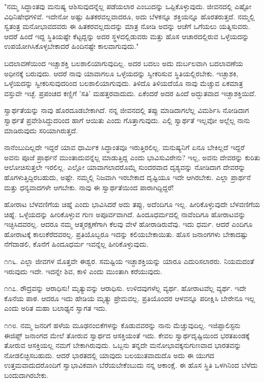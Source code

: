 "ನಮ್ಮ ಸಿದ್ಧಾಂತವು ಮನುಷ್ಯ ಆಶಿಸುವುದನ್ನೆಲ್ಲ ಪಡೆಯಲಾರ ಎಂಬುದನ್ನು ಒಪ್ಪಿಕೊಳ್ಳುವುದು. ಜೀವನದಲ್ಲಿ ಎಷ್ಟೋ ವಿಧಿನಿಷೇಧಗಳಿವೆ. ಇದೇನೋ ಅಷ್ಟು ಹಿತಕರವಲ್ಲವಾದರೂ, ಅದು ಬೆಳಕನ್ನೂ ಶಕ್ತಿಯನ್ನೂ ಹೊರತರುತ್ತದೆ. ನಮ್ಮಲ್ಲಿ ಸ್ವತಂತ್ರ ಮನೋಭಾವದವರು ಈ ಹಿತಕರವಲ್ಲದುದನ್ನು ಮಾತ್ರ ನೋಡಿ ಅದನ್ನು ಆಚೆಗೆ ಒಗೆಯಲು ಯತ್ನಿಸುವರು. ಆದರೆ ಹಿಂದೆ ಇದ್ದ ಸ್ಥಿತಿಯಷ್ಟೇ ಕೆಟ್ಟದ್ದನ್ನು ಅದರ ಸ್ಥಳದಲ್ಲಿಡುವರು ಮತ್ತು ಹೊಸ ಆಚಾರದಲ್ಲಿರುವ ಒಳ್ಳೆಯದನ್ನು ಉಪಯೋಗಿಸಿಕೊಳ್ಳಬೇಕಾದರೆ ಹಿಂದಿನಷ್ಟೇ ಕಾಲವಾಗುವುದು."

ಬದಲಾವಣೆಯಿಂದ ಇಚ್ಚಾಶಕ್ತಿ ಬಲಶಾಲಿಯಾಗುವುದಿಲ್ಲ. ಅದರ ಬದಲು ಅದು ದುರ್ಬಲವಾಗಿ ಬದಲಾವಣೆಯ ಅಧೀನಕ್ಕೆ ಬರುವುದು. ಆದರೆ ನಾವು ಯಾವಾಗಲೂ ಒಳ್ಳೆಯದನ್ನು ಸ್ವೀಕರಿಸುವ ಸ್ಥಿತಿಯಲ್ಲಿರಬೇಕು. ಇಚ್ಛಾಶಕಿ, ಒಳ್ಳೆಯದನ್ನು ಸ್ವೀಕರಿಸುವುದರಿಂದ ಬಲಶಾಲಿಯಾಗುವುದು. ತಿಳಿದೊ ತಿಳಿಯದೆಯೊ ನಾವು ಮೆಚ್ಚುವ ಏಕಮಾತ್ರ ವಸ್ತುವೇ ಇಚ್ಛೆ. ಪ್ರಪಂಚದ ಕಣ್ಣಿಗೆ 'ಸತಿ' ಮಹತ್ತರವಾದುದು. ಏಕೆಂದರೆ ಅದರ ಹಿಂದೆ ಅದ್ಭುತವಾದ ಇಚ್ಛಾಶಕ್ತಿಯಿದೆ.

ಸ್ವಾರ್ಥತೆಯನ್ನು ನಾವು ಹೊರದೂಡಬೇಕಾಗಿದೆ. ನನ್ನ ಜೀವನದಲ್ಲಿ ತಪ್ಪು ಮಾಡಿದಾಗಲೆಲ್ಲ ವಿಮರ್ಶಿಸಿ ನೋಡಿದಾಗ ಸ್ವಾರ್ಥತೆ ಪ್ರವೇಶಿಸಿದ್ದುದರಿಂದ ಹಾಗೆ ಆಯಿತು ಎಂದು ಗೊತ್ತಾಗುವುದು. ಎಲ್ಲಿ ಸ್ವಾರ್ಥತೆ ಇಲ್ಲವೋ ಅಲ್ಲೆಲ್ಲ ನಾನು ಮಾಡಿರುವುದು ಸರಿಯಾಗಿರುತ್ತದೆ.

ನಾನೆಂಬುದಿಲ್ಲದೇ ಇದ್ದರೆ ಯಾವ ಧಾರ್ಮಿಕ ಸಿದ್ಧಾಂತವೂ ಇರುತ್ತಿರಲಿಲ್ಲ. ಮನುಷ್ಯನಿಗೆ ಏನೂ ಬೇಕಿಲ್ಲದೆ ಇದ್ದರೆ ಅವನು ಪೂಜೆ ಪ್ರಾರ್ಥನೆ ಮುಂತಾದುವನ್ನೆಲ್ಲ ಮಾಡುತ್ತಿದ್ದ ಎಂದು ಭಾವಿಸುವಿರೇನು? ಇಲ್ಲ, ಅವನು ದೇವರನ್ನು ಕುರಿತು ಆಲೋಚಿಸುತ್ತಲೇ ಇರಲಿಲ್ಲ. ಎಲ್ಲೋ ಯಾವಾಗಲಾದರೊಮ್ಮೆ ಸುಂದರವಾದ ದೃಶ್ಯವನ್ನು ನೋಡಿದಾಗ ದೇವರನ್ನು ಹೊಗಳುತ್ತಿದ್ದಿರಬಹುದು, ಅಷ್ಟೇ. ನಮ್ಮಲ್ಲಿ ನಿಜವಾಗಿ ಇರಬೇಕಾದ ದೃಷ್ಟಿಯೂ ಇದೇ ಆಗಿರಬೇಕು. ಎಲ್ಲಾ ಪ್ರಾರ್ಥನೆ ಮತ್ತು ಧನ್ಯವಾದಗಳೇ ಆಗಬೇಕು. ನಾವು ಈ ಸ್ವಾರ್ಥತೆಯಿಂದ ಪಾರಾಗಿದ್ದಿದ್ದರೆ!

ಹೋರಾಟ ಬೆಳವಣಿಗೆಯ ಚಿಹ್ನೆ ಎಂದು ಭಾವಿಸಿದರೆ ಅದು ತಪ್ಪು, ಅದೆಂದಿಗೂ ಇಲ್ಲ. ಹೀರಿಕೊಳ್ಳುವುದೇ ಬೆಳವಣಿಗೆಯ ಚಿಹ್ನೆ. ಒಳ್ಳೆಯದನ್ನು ಹೀರಿಕೊಳ್ಳುವ ಗುಣ ಅಪೂರ್ವವಾಗಿದೆ. ಹಿಂದೂಧರ್ಮದಲ್ಲಿ ನಾವೆಂದಿಗೂ ಹೋರಾಟವನ್ನು ಇಚ್ಛಿಸಿದವರಲ್ಲ. ಆದರೂ ನಮ್ಮ ಆತ್ಮರಕ್ಷಣೆಗಾಗಿ ಕೆಲವು ವೇಳೆ ಹೋರಾಡಿರುವೆವು. ಇದು ಧರ್ಮ. ಆದರೆ ಎಂದಿಗೂ ಹೋರಾಟಕ್ಕೆ ಕಾಲುಕೆರೆದವರಲ್ಲ. ಪ್ರತಿಯೊಬ್ಬರೂ ಇದನ್ನು ಕಲಿಯಬೇಕಾಯಿತು. ಹೊಸ ಜನಾಂಗಗಳು ಬೇಕಾದಷ್ಟು ನೆಗೆದಾಡಲಿ, ಕೊನೆಗೆ ಹಿಂದೂಧರ್ಮ ಇವನ್ನೆಲ್ಲ ಹೀರಿಕೊಳ್ಳುವುದು.

೧೧೬. ಎಲ್ಲಾ ಜೀವಗಳ ಮೊತ್ತವೇ ಈಶ್ವರ. ಸಮಷ್ಟಿಯ ಇಚ್ಛಾಶಕ್ತಿಯನ್ನು ಯಾರೂ ಎದುರಿಸಲಾರರು. ನಿಯಮದಂತೆ ಇರುವುದು ಇದೇ. ಇದನ್ನೇ ಶಿವ, ಕಾಳಿ ಎಂದು ಮುಂತಾಗಿ ಕರೆಯುವುದು.

೧೧೭. ರೌದ್ರವನ್ನು ಆರಾಧಿಸು! ಮೃತ್ಯುವನ್ನು ಆರಾಧಿಸು. ಉಳಿದವುಗಳೆಲ್ಲ ವ್ಯರ್ಥ. ಹೋರಾಟವೆಲ್ಲ ವ್ಯರ್ಥ. ಇದೇ ಕೊನೆಯ ಪಾಠ. ಆದರೂ ಇದು ಹೇಡಿಯ ಮೃತ್ಯು ಪ್ರೇಮವಲ್ಲ. ಪ್ರತಿಯೊಂದರ ಆಳವನ್ನೂ ಪರೀಕ್ಷಿಸಿ ಬೇರೇನೂ ಇಲ್ಲ ಎಂದು ಅರಿತ ಮಹಾ ಬಲಾಢ್ಯನ ಸ್ವಾಗತ ಇದು.

೧೧೮. ನಮ್ಮ ಜನರಿಗೆ ಹಳೆಯ ಮೂಢನಂಬಿಕೆಗಳನ್ನು ಕೊಡುವವರನ್ನು ನಾನು ಮೆಚ್ಚುವುದಿಲ್ಲ. ಇಜಿಪ್ಟಾಲಿಸ್ಟನು ಈಜಿಪ್ಟ್ ಜನಾಂಗದ ಮೇಲೆ ತೋರುವ ಸ್ವಾರ್ಥದ ಆಸಕ್ತಿಯಂತೆ ಇದು. ಕೇವಲ ಸ್ವಾರ್ಥದೃಷ್ಟಿಯಿಂದ ಭರತಖಂಡಕ್ಕೆ ತೋರುವ ಆಸಕ್ತಿಯಲ್ಲ ನಮಗೆ ಬೇಕಾಗಿರುವುದು. ಒಬ್ಬನು ತನ್ನದೇ ಮನೋಭಾವಕ್ಕನುಗುಣವಾದ ಭಾರತವನ್ನು ನೋಡಲಿಚ್ಛಿಸಬಹುದು. ಆದರೆ ಭಾರತದಲ್ಲಿ ಯಾವುದು ಬಲಯುತವಾದುದೊ ಅದು ಈ ಯುಗದ ಉತ್ತಮವಾದುದರೊಂದಿಗೆ ಸ್ವಾಭಾವಿಕವಾಗಿ ಬೆರೆಯಬೇಕೆಂಬುದು ನನ್ನ ಆಕಾಂಕ್ಷೆ. ಈ ಹೊಸ ಸ್ಥಿತಿ ಒಳಗಿನಿಂದ ಬೆಳೆದು ಬಂದುದಾಗಿರಬೇಕು.

